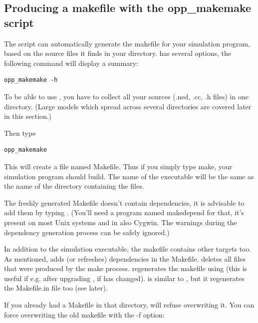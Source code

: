 \subsection{Producing a makefile with the opp\_makemake script}

The  script can automatically generate the
makefile for your simulation program, based on the source files it
finds in your directory.  has several options,
the following command will display a summary:

\begin{Verbatim}
opp_makemake -h
\end{Verbatim}

To be able to use , you have to collect all your 
sources (.ned, .cc, .h files) in one directory. (Large models 
which spread across several directories are covered later in 
this section.)


Then type 

\begin{Verbatim}
opp_makemake
\end{Verbatim}

This will create a file named Makefile. Thus if you
simply type make, your simulation program should build. The name of
the executable will be the same as the name of the directory
containing the files.


The freshly generated Makefile doesn't contain
dependencies, it is advisable to add them
by typing . (You'll need a program named makedepend
for that, it's present on most Unix systems and in also Cygwin. The
warnings during the dependency generation process can be safely
ignored.)

In addition to the simulation executable, the makefile contains other
targets too. As mentioned,  adds (or refreshes)
dependencies in the Makefile.  deletes all files
that were produced by the make process. 
regenerates the makefile using  (this is useful
if e.g.  after upgrading {\opp}, if  has
changed).  is similar to , but it regenerates the Makefile.in file too (see
later).

If you already had a Makefile in that directory, 
will refuse overwriting it. You can force overwriting the old makefile
with the -f option:

